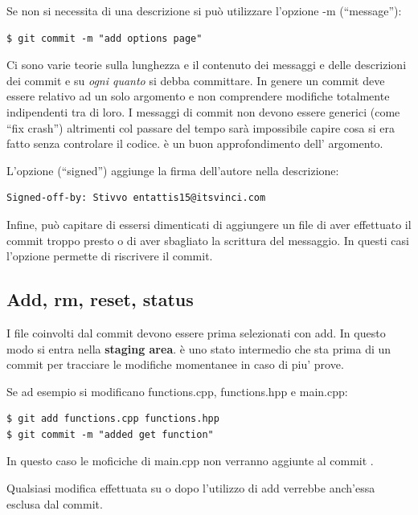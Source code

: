 \documentclass{article}
\begin{document}
Se non si necessita di una descrizione si può utilizzare l'opzione -m
(``message''):

\begin{verbatim}
$ git commit -m "add options page"
\end{verbatim}

Ci sono varie teorie  sulla lunghezza e il contenuto dei messaggi e delle
descrizioni dei commit e su \textit{ogni quanto} si debba committare. In genere un
commit deve essere relativo ad un solo argomento e non comprendere modifiche
totalmente indipendenti tra di loro. I messaggi di commit non devono essere
generici (come ``fix crash'') altrimenti col passare del tempo sarà impossibile
capire cosa si era fatto senza controlare il codice.
 è un buon
approfondimento dell' argomento.

L'opzione  (``signed'') aggiunge la firma dell'autore nella descrizione:

\begin{verbatim}
Signed-off-by: Stivvo entattis15@itsvinci.com
\end{verbatim}

Infine, può capitare di essersi dimenticati di aggiungere un file di aver
effettuato il commit troppo presto o di aver sbagliato la scrittura del
messaggio.
In questi casi l'opzione  permette di riscrivere il commit.

\subsection{Add, rm, reset, status}
I file coinvolti dal commit devono essere prima selezionati con add. In questo
modo si entra nella \textbf{staging area}. è uno stato intermedio che sta prima di
un commit per tracciare le modifiche momentanee in caso di piu' prove.

Se ad esempio si modificano functions.cpp, functions.hpp e main.cpp:

\begin{verbatim}
$ git add functions.cpp functions.hpp
$ git commit -m "added get function"
\end{verbatim}

In questo caso le moficiche di main.cpp non verranno aggiunte al commit .

Qualsiasi modifica effettuata su  o  dopo l'utilizzo
di add verrebbe anch'essa esclusa dal commit.
\end{document}
